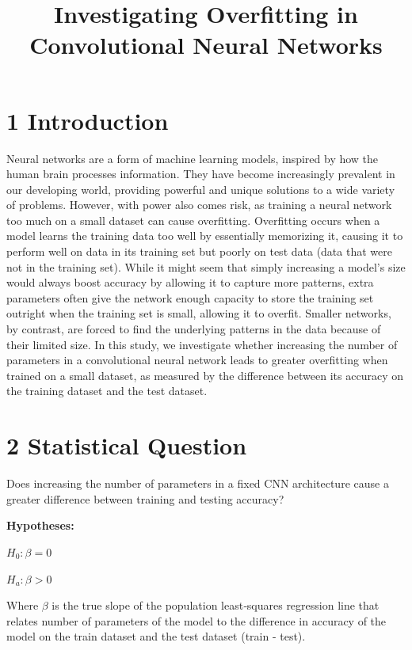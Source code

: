 \documentclass[12pt]{article}
\title{Investigating Overfitting in Convolutional Neural Networks}\date{}
\begin{document}
    \maketitle

    \section*{1 Introduction}

    Neural networks are a form of machine learning models, inspired by how the human brain
    processes information. They have become increasingly prevalent in our developing world, providing
    powerful and unique solutions to a wide variety of problems. However, with power also comes risk,
    as training a neural network too much on a small dataset can cause overfitting. Overfitting occurs
    when a model learns the training data too well by essentially memorizing it, causing it to perform
    well on data in its training set but poorly on test data (data that were not in the training set).
    While it might seem that simply increasing a model’s size would always boost accuracy by allowing it to
    capture more patterns, extra parameters often give the network enough capacity to store the training set
    outright when the training set is small, allowing it to overfit. Smaller networks, by contrast, are forced to find the underlying patterns
    in the data because of their limited size. In this study, we investigate whether increasing the number of
    parameters in a convolutional neural network leads to greater overfitting when trained on a small dataset, as
    measured by the difference between its accuracy on the training dataset and the test dataset.

    \section*{2 Statistical Question}

    Does increasing the number of parameters in a fixed CNN architecture cause a greater difference
    between training and testing accuracy?

    \noindent\textbf{Hypotheses:}\newline
    \centerline{$H_0: \beta = 0$} \newline
    \centerline{$H_a: \beta > 0$} \newline
    Where $\beta$ is the true slope of the population least‐squares regression line that relates number
    of parameters of the model to the difference in accuracy of the model on the train dataset and the
    test dataset (train - test).
\end{document}
